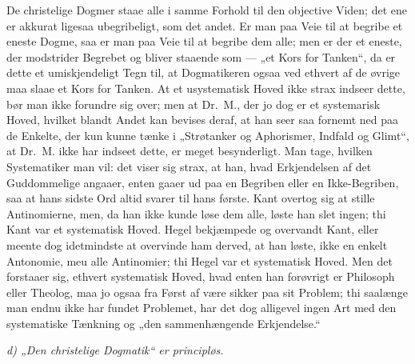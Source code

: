 De christelige Dogmer staae alle i samme Forhold
 til den objective Viden; det ene er akkurat ligesaa ubegribeligt,
som det andet. Er man paa Veie til at begribe et eneste Dogme, saa
er man paa Veie til at begribe dem alle; men er der et eneste, der
modstrider Begrebet og bliver staaende som --- „et Kors for
Tanken“, da er dette et umiskjendeligt Tegn til, at Dogmatikeren
ogsaa ved ethvert af de øvrige maa slaae et Kors for Tanken. At et
usystematisk Hoved ikke strax indseer dette, bør man ikke forundre
sig over; men at Dr.\ M., der jo dog er et systemarisk Hoved,
hvilket blandt Andet kan bevises deraf, at han seer saa fornemt
ned paa de Enkelte, der kun kunne tænke i „Strøtanker og
Aphorismer, Indfald og Glimt“, at Dr.\ M. ikke har indseet dette,
er meget besynderligt. Man tage, hvilken Systematiker man vil: det
viser sig strax, at han, hvad Erkjendelsen af det Guddommelige
angaaer, enten gaaer ud paa en Begriben eller en Ikke-Begriben,
saa at hans sidste Ord altid svarer til hans første. Kant overtog
sig at stille Antinomierne, men, da han ikke kunde løse dem alle,
løste han slet ingen; thi Kant var et systematisk Hoved. Hegel
bekjæmpede og overvandt Kant, eller meente dog idetmindste at
overvinde ham derved, at han
 løste, ikke en enkelt Antonomie, meu alle Antinomier; thi Hegel
var et systematisk Hoved. Men det forstaaer sig, ethvert
systematisk Hoved, hvad enten han forøvrigt er Philosoph eller
Theolog, maa jo ogsaa fra Først af være sikker paa sit Problem;
thi saalænge man endnu ikke har fundet Problemet, har det dog
alligevel ingen Art med den systematiske Tænkning og „den
sammenhængende Erkjendelse.“

\begin{center}
\emph{d) „Den christelige Dogmatik“ er principløs.}
\end{center}

